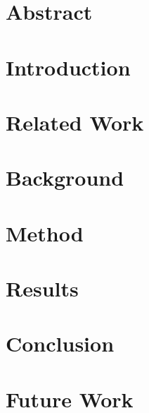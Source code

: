\documentclass[a4paper, 12pt]{article}
\begin{document}


\setcounter{page}{2}
\tableofcontents
\newpage

\listoftodos
\section*{Abstract}


\section{Introduction}



\section{Related Work}


\section{Background}


\section{Method}


\section{Results}


\section{Conclusion}
\section{Future Work}

\printbibliography
\end{document}
